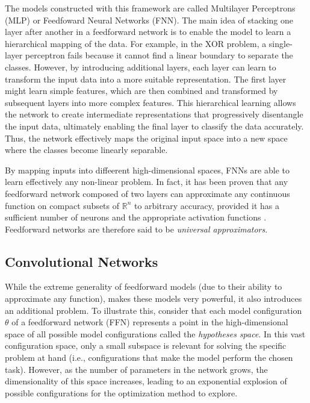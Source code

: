The models constructed with this framework are called Multilayer Perceptrons
(MLP)  or Feedfoward Neural Networks (FNN). The main
idea of stacking one layer after another in a feedforward network is to enable
the model to learn a hierarchical mapping of the data. For example, in the XOR
problem, a single-layer perceptron fails because it cannot find a linear
boundary to separate the classes. However, by introducing additional layers,
each layer can learn to transform the input data into a more suitable
representation. The first layer might learn simple features, which are then
combined and transformed by subsequent layers into more complex features. This
hierarchical learning allows the network to create intermediate representations
that progressively disentangle the input data, ultimately enabling the final
layer to classify the data accurately. Thus, the network effectively maps the
original input space into a new space where the classes become linearly
separable.

By mapping inputs into diffeerent high-dimensional spaces, FNNs are able to
learn effectively any non-linear problem. In fact, it has been proven that any
feedforward network composed of two layers can approximate any continuous
function on compact subsets of $\mathbb{R}^n$ to arbitrary accuracy, provided it
has a sufficient number of neurons and the appropriate activation functions
. Feedforward networks are therefore said to be
\emph{universal approximators}.

\subsection{Convolutional Networks}
While the extreme generality of feedforward models (due to their ability to
approximate any function), makes these models very powerful, it also introduces
an additional problem. To illustrate this, consider that each model
configuration $\theta$ of a feedforward network (FFN) represents a point in the
high-dimensional space of all possible model configurations called the
\emph{hypotheses space}. In this vast configuration space, only a small subspace
is relevant for solving the specific problem at hand (i.e., configurations that
make the model perform the chosen task). However, as the number of parameters in
the network grows, the dimensionality of this space increases, leading to an
exponential explosion of possible configurations for the optimization method to
explore. 

